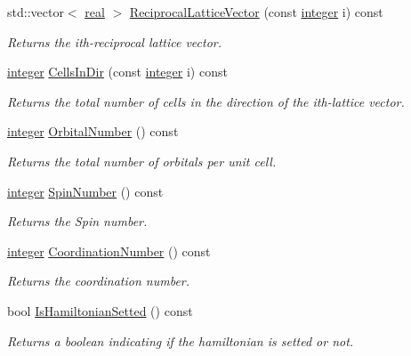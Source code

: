 \begin{DoxyCompactItemize}
std\+::vector$<$ \hyperlink{namespaceNumCal_ac10564761316cff6fb75fe8bfccd6def}{real} $>$ \hyperlink{classNumCal_1_1Lattice_a332fbad7d9bd9c2d641712bd7e885fb7}{Reciprocal\+Lattice\+Vector} (const \hyperlink{namespaceNumCal_ae1031b42812e871d8f5bd9b7b15fc7d8}{integer} i) const 
\begin{DoxyCompactList}\small\item\em Returns the ith-\/reciprocal lattice vector. \end{DoxyCompactList}\item 
\hyperlink{namespaceNumCal_ae1031b42812e871d8f5bd9b7b15fc7d8}{integer} \hyperlink{classNumCal_1_1Lattice_a5f516278aa056221ee646c9fbdd3812e}{Cells\+In\+Dir} (const \hyperlink{namespaceNumCal_ae1031b42812e871d8f5bd9b7b15fc7d8}{integer} i) const 
\begin{DoxyCompactList}\small\item\em Returns the total number of cells in the direction of the ith-\/lattice vector. \end{DoxyCompactList}\item 
\hyperlink{namespaceNumCal_ae1031b42812e871d8f5bd9b7b15fc7d8}{integer} \hyperlink{classNumCal_1_1Lattice_ab1d968adc1de105969607ed081da6075}{Orbital\+Number} () const 
\begin{DoxyCompactList}\small\item\em Returns the total number of orbitals per unit cell. \end{DoxyCompactList}\item 
\hyperlink{namespaceNumCal_ae1031b42812e871d8f5bd9b7b15fc7d8}{integer} \hyperlink{classNumCal_1_1Lattice_afbbb05a9bccb38017cc2a594e526e7fe}{Spin\+Number} () const 
\begin{DoxyCompactList}\small\item\em Returns the Spin number. \end{DoxyCompactList}\item 
\hyperlink{namespaceNumCal_ae1031b42812e871d8f5bd9b7b15fc7d8}{integer} \hyperlink{classNumCal_1_1Lattice_a203d44aacacae07b88e9bb66f284963b}{Coordination\+Number} () const 
\begin{DoxyCompactList}\small\item\em Returns the coordination number. \end{DoxyCompactList}\item 
bool \hyperlink{classNumCal_1_1Lattice_a419fb070cfe453c42f6051321b794607}{Is\+Hamiltonian\+Setted} () const 
\begin{DoxyCompactList}\small\item\em Returns a boolean indicating if the hamiltonian is setted or not. \end{DoxyCompactList}\item 

\end{DoxyCompactItemize}
